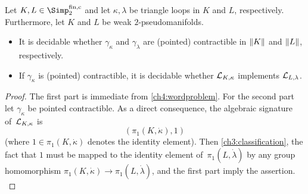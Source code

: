 \begin{thCorollary}
    \label{ch4:latonpmfd}
    Let $K,L\in\finSimp$ and let $\kappa,\lambda$ be triangle loops in $K$ and
    $L$, respectively. Furthermore, let $K$ and $L$ be weak $2$-pseudomanifolds.
    \begin{itemize}
        \item 
            It is decidable whether $\gamma_\kappa$ and $\gamma_\lambda$
            are (pointed) contractible in $\lVert K\rVert$ and $\lVert L\rVert$,
            respectively.
            
        \item
            If $\gamma_\kappa$ is (pointed) contractible,
            it is decidable whether $\mathcal{L}_{K,\kappa}$ implements $\mathcal{L}_{L,\lambda}$.
    \end{itemize}
\end{thCorollary}

\begin{proof}
    The first part is immediate from \cref{ch4:wordproblem}. For the second
    part let $\gamma_\kappa$ be pointed  contractible. As a direct consequence, the
    algebraic signature of~$\mathcal{L}_{K,\kappa}$ is
    \[ (\pi_1(K,\dot\kappa), 1) \]
    (where $1\in\pi_1(K,\dot\kappa)$ denotes the identity element).
    Then \cref{ch3:classification}, the fact that $1$ must be mapped to the
    identity element of~$\pi_1(L,\dot\lambda)$ by any group homomorphism
    $\pi_1(K,\dot\kappa)\to\pi_1(L,\dot\lambda)$, and the first part imply
    the assertion.
    \\
\end{proof}

